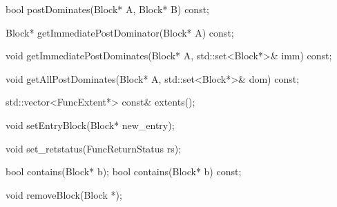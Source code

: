 \begin{apient}
bool postDominates(Block* A, Block* B) const;
\end{apient}

\begin{apient}
Block* getImmediatePostDominator(Block* A) const;
\end{apient}

\begin{apient}
void getImmediatePostDominates(Block* A, std::set<Block*>& imm) const;
\end{apient}

\begin{apient}
void getAllPostDominates(Block* A, std::set<Block*>& dom) const;
\end{apient}




\begin{apient}
std::vector<FuncExtent*> const& extents();
\end{apient}

\begin{apient}
void setEntryBlock(Block* new_entry);
\end{apient}

\begin{apient}
void set_retstatus(FuncReturnStatus rs);
\end{apient}

\begin{apient}
bool contains(Block* b);
bool contains(Block* b) const;
\end{apient}


\begin{apient}
void removeBlock(Block *);
\end{apient}
